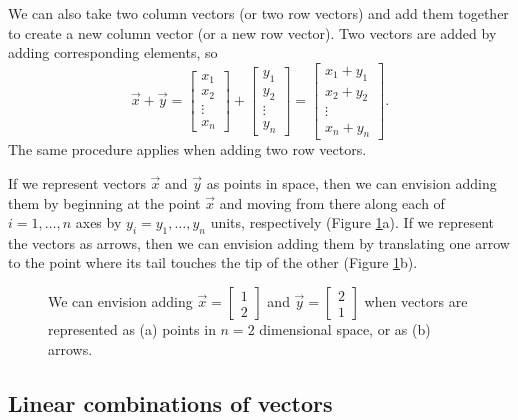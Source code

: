 \documentclass[../book.tex]{subfiles}
\begin{document}
We can also take two column vectors (or two row vectors) and add them together to create a new column vector (or a new row vector). Two vectors are added by adding corresponding elements, so
\begin{equation}\label{eq:vec-7}
\vec{x} + \vec{y}
=
\begin{bmatrix}
  x_1 \\ x_2 \\ \vdots \\ x_n
\end{bmatrix}
+
\begin{bmatrix}
  y_1 \\ y_2 \\ \vdots \\ y_n
\end{bmatrix}
=
\begin{bmatrix}
  x_1 + y_1 \\
  x_2 + y_2 \\
  \vdots \\
  x_n + y_n
\end{bmatrix}.
\end{equation}
The same procedure applies when adding two row vectors.

If we represent vectors \(\vec{x}\) and \(\vec{y}\) as points in space, then we can envision adding them by beginning at the point \(\vec{x}\) and moving from there along each of \(i=1, \ldots, n\) axes by \(y_i = y_1, \ldots, y_n\) units, respectively (Figure \ref{fig:summation}a). If we represent the vectors as arrows, then we can envision adding them by translating one arrow to the point where its tail touches the tip of the other (Figure \ref{fig:summation}b).

\begin{figure}[htbp]
  \centering
  \caption{We can envision adding \(\vec{x} = \begin{bmatrix}1 \\ 2\end{bmatrix}\) and \(\vec{y} = \begin{bmatrix}2 \\ 1\end{bmatrix}\) when vectors are represented as (a) points in \(n=2\) dimensional space, or as (b) arrows.}
  \label{fig:summation}
\end{figure}

\subsection{Linear combinations of vectors}
\end{document}
